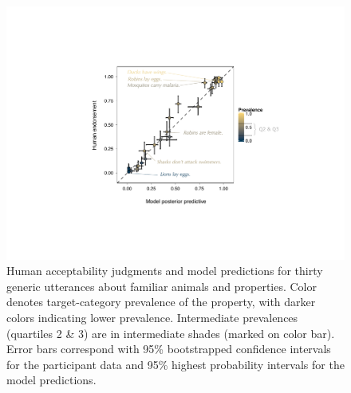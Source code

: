 \documentclass{pnastwo}
\begin{document}
\begin{figure}
\centering
    \includegraphics[width=\columnwidth]{truthjudge-scatter-wLabels.pdf}
    \caption{Human acceptability judgments and model predictions for thirty generic utterances about familiar animals and properties. 
    Color denotes target-category prevalence of the property, with darker colors indicating lower prevalence. 
    Intermediate prevalences (quartiles 2 \& 3) are in intermediate shades (marked on color bar).
    Error bars correspond with 95\% bootstrapped confidence intervals for the participant data and 95\% highest probability intervals for the model predictions.
    }
  \label{fig:modeldataBars}
\end{figure}
\end{document}

